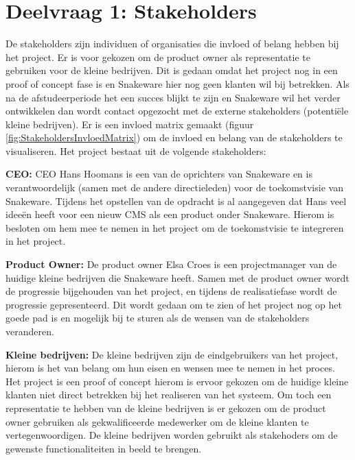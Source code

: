 \section{Deelvraag 1: Stakeholders}
\label{sec:Stakeholders}
De stakeholders zijn individuen of organisaties die invloed of belang hebben bij het project.
Er is voor gekozen om de product owner als representatie te gebruiken voor de kleine bedrijven.
Dit is gedaan omdat het project nog in een proof of concept fase is en Snakeware hier nog geen klanten wil bij betrekken.
Als na de afstudeerperiode het een succes blijkt te zijn en Snakeware wil het verder ontwikkelen dan wordt contact opgezocht met de externe stakeholders (potentiële kleine bedrijven).
Er is een invloed matrix gemaakt (figuur \ref{fig:StakeholdersInvloedMatrix}) om de invloed en belang van de stakeholders te visualiseren.
Het project bestaat uit de volgende stakeholders:

\whitespace
\textbf{CEO:}
CEO Hans Hoomans is een van de oprichters van Snakeware en is verantwoordelijk (samen met de andere directieleden) voor de toekomstvisie van Snakeware.
Tijdens het opstellen van de opdracht is al aangegeven dat Hans veel ideeën heeft voor een nieuw \gls{CMS} als een product onder Snakeware.
Hierom is besloten om hem mee te nemen in het project om de toekomstvisie te integreren in het project.

\whitespace
\textbf{Product Owner:}
De product owner Elsa Croes is een projectmanager van de huidige kleine bedrijven die Snakeware heeft.
Samen met de product owner wordt de progressie bijgehouden van het project, en tijdens de realisatiefase wordt de progressie gepresenteerd.
Dit wordt gedaan om te zien of het project nog op het goede pad is en mogelijk bij te sturen als de wensen van de stakeholders veranderen.

\whitespace
\textbf{Kleine bedrijven:}
De kleine bedrijven zijn de eindgebruikers van het project, hierom is het van belang om hun eisen en wensen mee te nemen in het proces.
Het project is een proof of concept hierom is ervoor gekozen om de huidige kleine klanten niet direct betrekken bij het realiseren van het systeem.
Om toch een representatie te hebben van de kleine bedrijven is er gekozen om de product owner gebruiken als gekwalificeerde medewerker om de kleine klanten te vertegenwoordigen.
De kleine bedrijven worden gebruikt als stakehoders om de gewenste functionaliteiten in beeld te brengen.

